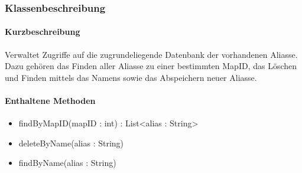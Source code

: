\subsubsection*{Klassenbeschreibung}%
\paragraph*{Kurzbeschreibung}
Verwaltet Zugriffe auf die zugrundeliegende Datenbank der vorhandenen Aliasse.
Dazu gehören das Finden aller Aliasse zu einer bestimmten MapID, das Löschen und Finden mittels das Namens sowie
das Abspeichern neuer Aliasse.
\paragraph*{Enthaltene Methoden}
\begin{itemize}
    \item findByMapID(mapID : int) : List<alias : String>
    \item deleteByName(alias : String) 
    \item findByName(alias : String)
\end{itemize}
